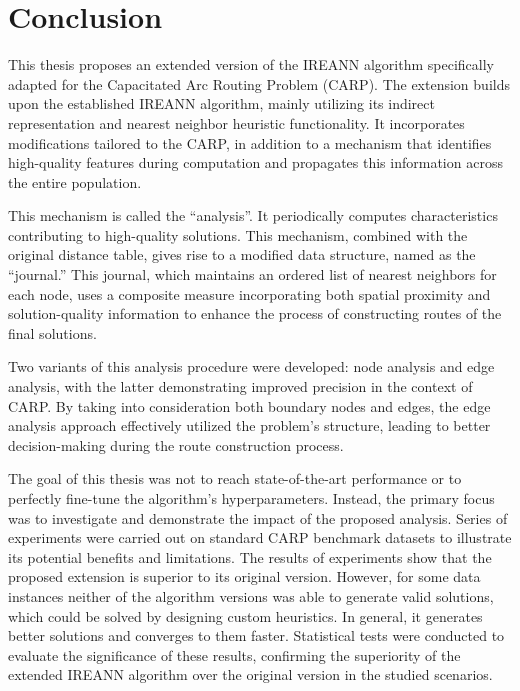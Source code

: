 \documentclass[twoside]{ctuthesis}
\theoremstyle{plain}
\theoremstyle{definition}
\theoremstyle{note}
\begin{document}
\chapter{Conclusion}

This thesis proposes an extended version of the IREANN algorithm specifically adapted for the Capacitated Arc Routing Problem (CARP). The extension builds upon the established IREANN algorithm, mainly utilizing its indirect representation and nearest neighbor heuristic functionality. It incorporates modifications tailored to the CARP, in addition to a mechanism that identifies high-quality features during computation and propagates this information across the entire population.

This mechanism is called the ``analysis''. It periodically computes characteristics contributing to high-quality solutions. This mechanism, combined with the original distance table, gives rise to a modified data structure, named as the ``journal.'' This journal, which maintains an ordered list of nearest neighbors for each node, uses a composite measure incorporating both spatial proximity and solution-quality information to enhance the process of constructing routes of the final solutions.

Two variants of this analysis procedure were developed: node analysis and edge analysis, with the latter demonstrating improved precision in the context of CARP. By taking into consideration both boundary nodes and edges, the edge analysis approach effectively utilized the problem's structure, leading to better decision-making during the route construction process.

The goal of this thesis was not to reach state-of-the-art performance or to perfectly fine-tune the algorithm's hyperparameters. Instead, the primary focus was to investigate and demonstrate the impact of the proposed analysis. Series of experiments were carried out on standard CARP benchmark datasets to illustrate its potential benefits and limitations. The results of experiments show that the proposed extension is superior to its original version. 
However, for some data instances neither of the algorithm versions was able to generate valid solutions, which could be solved by designing custom heuristics. In general, it generates better solutions and converges to them faster. Statistical tests were conducted to evaluate the significance of these results, confirming the superiority of the extended IREANN algorithm over the original version in the studied scenarios.
\end{document}
